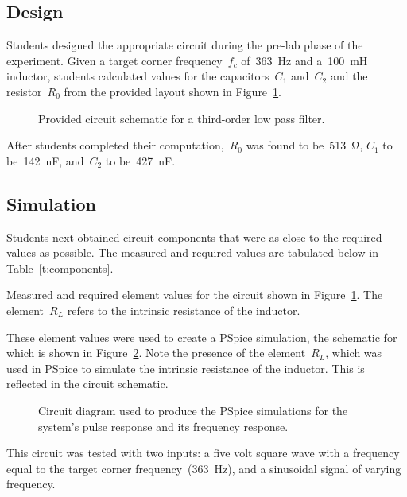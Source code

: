\subsection{Design}
Students designed the appropriate circuit during the pre-lab phase of the
experiment.  Given a target corner frequency~$f_c$ of~\SI{363}{\hertz} and
a~\SI{100}{\milli\henry} inductor, students calculated values for the
capacitors~$C_1$ and~$C_2$ and the resistor~$R_0$ from the provided layout
shown in Figure~\ref{f:prelabSchem}.
%
\begin{figure}[H]
	\centering
	
	\parbox{.6\textwidth}{
	\caption[Prelab Circuit Diagram]{Provided circuit schematic for a third-order low pass filter.}
	\label{f:prelabSchem}}
\end{figure}
%
After students completed their computation,~$R_0$ was found to
be~\SI{513}{\ohm}, $C_1$ to be~\SI{142}{\nano\farad}, and~$C_2$ to
be~\SI{427}{\nano\farad}.

\subsection{Simulation}
Students next obtained circuit components that were as close to the required
values as possible.  The measured and required values are tabulated below in
Table~\ref{t:components}.
%
\begin{table}[H]
	\centering
	
	\parbox{.6\textwidth}{
	\caption[Required and Measured Element Values]{Measured and required
	element values for the circuit shown in Figure~\ref{f:prelabSchem}.  The
	element~$R_L$ refers to the intrinsic resistance of the inductor.}
	\label{t:components}}
\end{table}
%
These element values were used to create a PSpice simulation, the schematic for
which is shown in Figure~\ref{f:pspiceSchem}.  Note the presence of the
element~$R_L$, which was used in PSpice to simulate the intrinsic resistance of
the inductor.  This is reflected in the circuit schematic.
%
\begin{figure}[H]
	\centering
	
	\parbox{.6\textwidth}{
	\caption[PSpice Circuit Diagram]{Circuit diagram used to produce the PSpice
	simulations for the system's pulse response and its frequency response.}
	\label{f:pspiceSchem}}
\end{figure}
%
This circuit was tested with two inputs: a five volt square wave with a
frequency equal to the target corner frequency~(\SI{363}{\hertz}), and a
sinusoidal signal of varying frequency.

\begin{figure}[H]
	\centering
	
\end{figure}
